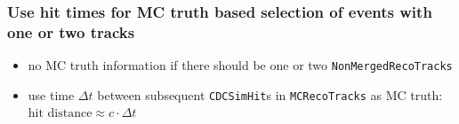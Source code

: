 \documentclass[18pt]{beamer}
\begin{document}
\begin{frame}
  \frametitle{Use hit times for MC truth based selection of events with one or two tracks }
  \begin{itemize}
  \item no MC truth information if there should be one or two \texttt{NonMergedRecoTracks}
  \item use time $\Delta t$ between subsequent \texttt{CDCSimHit}s in \texttt{MCRecoTracks} as MC truth:
    $\text{hit\ distance} \approx c\cdot\Delta t$
  \end{itemize}
  \begin{columns}
    \begin{column}{0.4\textwidth}
    \end{column}


\end{columns}
\end{frame}
\end{document}
